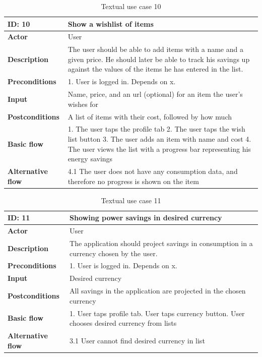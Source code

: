 \begin{table}[H]
\begin{tabular}{|l|p{11.7cm}|}
\hline
\textbf{ID: }10&\textbf{Show a wishlist of items }
\\\hline
\textbf{Actor} &User
\\\hline
\textbf{Description}&
The user should be able to add items with a name and a given price. He should later be able to track his savings up against the values of the items he has entered in the list.\\\hline
\textbf{Preconditions}&
1. User is logged in.\newline
Depends on x.\\\hline
\textbf{Input}&
Name, price, and an url (optional) for an item the user's wishes for
\\\hline
\textbf{Postconditions}& 
A list of items with their cost, followed by how much %
\\\hline
\textbf{Basic flow}&
1. The user taps the profile tab
2. The user taps the wish list button
3. The user adds an item with name and cost
4. The user views the list with a progress bar representing his energy savings\newline
\\\hline
\textbf{Alternative flow}&
4.1 The user does not have any consumption data, and therefore no progress is shown on the item
\\\hline
\end{tabular}
\caption{Textual use case 10}
\end{table}


\begin{table}[H]
\begin{tabular}{|l|p{11.7cm}|}
\hline
\textbf{ID: }11&\textbf{Showing power savings in desired currency}
\\\hline
\textbf{Actor} &User
\\\hline
\textbf{Description}&
The application should project savings in consumption in a currency chosen by the user.\\\hline
\textbf{Preconditions}&
1. User is logged in.\newline
Depends on x.\\\hline
\textbf{Input}&
Desired currency\\\hline
\textbf{Postconditions}& 
All savings in the application are projected in the chosen currency\\\hline
\textbf{Basic flow}&
1. User taps profile tab\newline
2. User taps currency button\newline
3. User chooses desired currency from lists
\\\hline
\textbf{Alternative flow}&
3.1 User cannot find desired currency in list
\\\hline
\end{tabular}
\caption{Textual use case 11}
\end{table}


